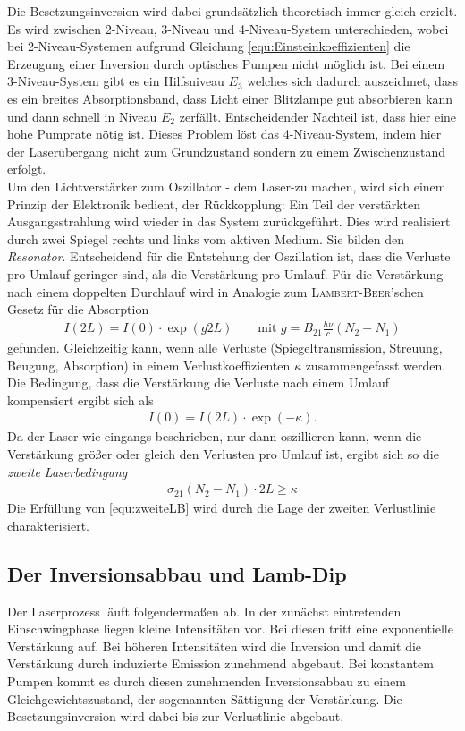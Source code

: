 \documentclass[a4paper,twoside,final]{article}
\begin{document}
Die Besetzungsinversion wird dabei grundsätzlich theoretisch immer gleich erzielt. Es wird zwischen 2-Niveau, 3-Niveau und 4-Niveau-System unterschieden, wobei bei 2-Niveau-Systemen aufgrund Gleichung \eqref{equ:Einsteinkoeffizienten} die Erzeugung einer Inversion durch optisches Pumpen nicht möglich ist. Bei einem 3-Niveau-System gibt es ein Hilfsniveau $E_3$ welches sich dadurch auszeichnet, dass es ein breites Absorptionsband, dass Licht einer Blitzlampe gut absorbieren kann und dann schnell in Niveau $E_2$ zerfällt. Entscheidender Nachteil ist, dass hier eine hohe Pumprate nötig ist. Dieses Problem löst das 4-Niveau-System, indem hier der Laserübergang nicht zum Grundzustand sondern zu einem Zwischenzustand erfolgt. \\
Um den Lichtverstärker zum Oszillator - dem Laser-zu machen, wird sich einem Prinzip der Elektronik bedient, der Rückkopplung: Ein Teil der verstärkten Ausgangsstrahlung wird wieder in das System zurückgeführt. Dies wird realisiert durch zwei Spiegel rechts und links vom aktiven Medium. Sie bilden den \textit{Resonator}. Entscheidend für die Entstehung der Oszillation ist, dass die Verluste pro Umlauf geringer sind, als die Verstärkung pro Umlauf. Für die Verstärkung nach einem doppelten Durchlauf wird in Analogie zum \textsc{Lambert-Beer}'schen Gesetz für die Absorption
\begin{align}
  I(2L)=I(0)\cdot \exp(g2L) \qquad \text{mit } g = B_{21} \frac{h\nu}{c} (N_2-N_1)
\end{align}
gefunden. Gleichzeitig kann, wenn alle Verluste (Spiegeltransmission, Streuung, Beugung, Absorption) in einem Verlustkoeffizienten $\kappa$ zusammengefasst werden. Die Bedingung, dass die Verstärkung die Verluste nach einem Umlauf kompensiert ergibt sich als
\begin{align}
  I(0)=I(2L)\cdot \exp(-\kappa).
\end{align}
Da der Laser wie eingangs beschrieben, nur dann oszillieren kann, wenn die Verstärkung größer oder gleich den Verlusten pro Umlauf ist, ergibt sich so die \textit{zweite Laserbedingung}
\begin{align}
  \boxed{\sigma_{21}(N_2-N_1)\cdot2L \geq \kappa}
  \label{equ:zweiteLB}
\end{align}
Die Erfüllung von \eqref{equ:zweiteLB} wird durch die Lage der zweiten Verlustlinie charakterisiert.


\subsection{Der Inversionsabbau und Lamb-Dip}\label{sec:InversionsabbauLambDip}
 Der Laserprozess läuft folgendermaßen ab. In der zunächst eintretenden Einschwingphase liegen kleine Intensitäten vor. Bei diesen tritt eine exponentielle Verstärkung auf. Bei höheren Intensitäten wird die Inversion und damit die Verstärkung durch induzierte Emission zunehmend abgebaut. Bei konstantem Pumpen kommt es durch diesen zunehmenden Inversionsabbau zu einem Gleichgewichtszustand, der sogenannten Sättigung der Verstärkung. Die Besetzungsinversion wird dabei bis zur Verlustlinie abgebaut.
\end{document}

